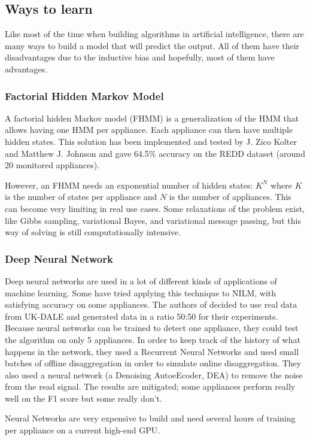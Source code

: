 \subsection{Ways to learn}
Like most of the time when building algorithms in artificial intelligence, there are many ways to build a model that will predict the output. All of them have their disadvantages due to the inductive bias and hopefully, most of them have advantages.
\subsubsection{Factorial Hidden Markov Model}
A factorial hidden Markov model (FHMM) is a generalization of the HMM that allows having one HMM per appliance.\cite{parson2014unsupervised} Each appliance can then have multiple hidden states. This solution has been implemented and tested by J. Zico Kolter and Matthew J. Johnson\cite{kolter2011redd} and gave 64.5\% accuracy on the REDD dataset (around 20 monitored appliances).

However, an FHMM needs an exponential number of hidden states: $K^N$ where $K$ is the number of states per appliance and $N$ is the number of appliances. This can become very limiting in real use cases. Some relaxations of the problem exist, like Gibbs sampling, variational Bayes, and variational message passing\cite{parson2014unsupervised}, but this way of solving is still computationally intensive.

\subsubsection{Deep Neural Network}
Deep neural networks are used in a lot of different kinds of applications of machine learning. Some have tried applying this technique to NILM, with satisfying accuracy on some appliances. The authors of \cite{kelly2015neural} decided to use real data from UK-DALE and generated data in a ratio 50:50 for their experiments. Because neural networks can be trained to detect one appliance, they could test the algorithm on only 5 appliances. In order to keep track of the history of what happens in the network, they used a Recurrent Neural Networks and used small batches of offline disaggregation in order to simulate online disaggregation. They also used a neural network (a Denoising AutoeEcoder, DEA) to remove the noise from the read signal. The results are mitigated; some appliances perform really well on the F1 score but some really don't.

Neural Networks are very expensive to build and need several hours of training per appliance on a current high-end GPU.

